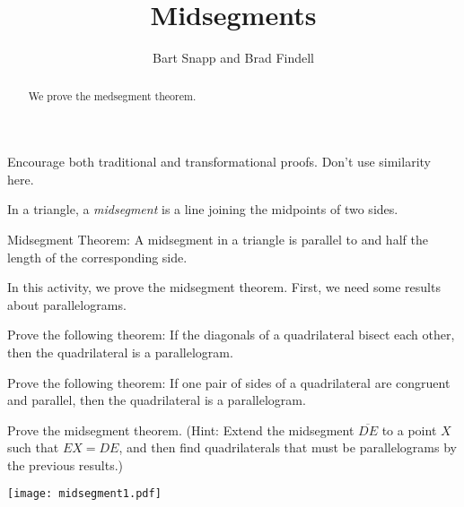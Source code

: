 \documentclass[nooutcomes]{ximera}
\title{Midsegments}
\author{Bart Snapp and Brad Findell}
\begin{document}
\begin{abstract}
  We prove the medsegment theorem.
\end{abstract}
\maketitle

\begin{teachingnote}
Encourage both traditional and transformational proofs.  Don't use similarity here.
\end{teachingnote}

\begin{definition}
In a triangle, a \emph{midsegment} is a line joining the midpoints of two sides.  
\end{definition}

\begin{theorem}
Midsegment Theorem:  A midsegment in a triangle is parallel to and half the length of the corresponding side.
\end{theorem}

In this activity, we prove the midsegment theorem.  First, we need some results about parallelograms. 

\begin{problem}
Prove the following theorem:  If the diagonals of a quadrilateral bisect each other, then the quadrilateral is a parallelogram. 
\vfill
\end{problem}

\begin{problem}
Prove the following theorem:  If one pair of sides of a quadrilateral are congruent and parallel, then the quadrilateral is a parallelogram. 
\vfill
\end{problem}

\newpage
\begin{problem}
Prove the midsegment theorem.  (Hint:  Extend the midsegment $\overline{DE}$ to a point $X$ such that $EX=DE$, and then find quadrilaterals that must be parallelograms by the previous results.)  
\begin{image}
\texttt{[image: midsegment1.pdf]}
\end{image}
\vfill
\end{problem}
\end{document}
